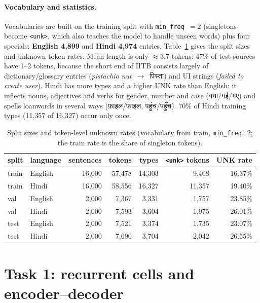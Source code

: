 \documentclass[10pt,a4paper]{article}
\newcommand{\hi}[1]{{\hindifont #1}}
\newcommand{\code}[1]{\texttt{#1}}
\begin{document}
\paragraph{Vocabulary and statistics.} Vocabularies are built on the training split with
\code{min\_freq}~$=2$ (singletons become \code{<unk>}, which also teaches the model to handle unseen words)
plus four specials: \textbf{English 4{,}899} and \textbf{Hindi 4{,}974} entries. Table~\ref{tab:data} gives
the split sizes and unknown-token rates. Mean length is only $\approx3.7$ tokens: 47\% of test sources have
1--2 tokens, because the short end of IITB consists largely of dictionary/glossary entries
(\emph{pistachio nut}~$\to$~\hi{पिस्ता}) and UI strings (\emph{failed to create user}). Hindi has more
types and a higher UNK rate than English: it inflects nouns, adjectives and verbs for gender, number and
case (\hi{गया/गई/गए}) and spells loanwords in several ways (\hi{फ़ाइल/फाइल}, \hi{पहुंच/पहुँच}). 70\% of
Hindi training types (11{,}357 of 16{,}327) occur only once.

\begin{table}[H]
\centering\small
\begin{tabular}{llrrrrr}
\toprule
split & language & sentences & tokens & types & \code{<unk>} tokens & UNK rate \\
\midrule
train & English & 16{,}000 & 57{,}478 & 14{,}303 & 9{,}408 & 16.37\% \\
train & Hindi   & 16{,}000 & 58{,}556 & 16{,}327 & 11{,}357 & 19.40\% \\
val   & English & 2{,}000 & 7{,}367 & 3{,}331 & 1{,}757 & 23.85\% \\
val   & Hindi   & 2{,}000 & 7{,}593 & 3{,}604 & 1{,}975 & 26.01\% \\
test  & English & 2{,}000 & 7{,}521 & 3{,}374 & 1{,}735 & 23.07\% \\
test  & Hindi   & 2{,}000 & 7{,}690 & 3{,}704 & 2{,}042 & 26.55\% \\
\bottomrule
\end{tabular}
\caption{Split sizes and token-level unknown rates (vocabulary from train, \code{min\_freq}=2; the train
rate is the share of singleton tokens).}
\label{tab:data}
\end{table}

\section{Task 1: recurrent cells and encoder--decoder}
\end{document}

